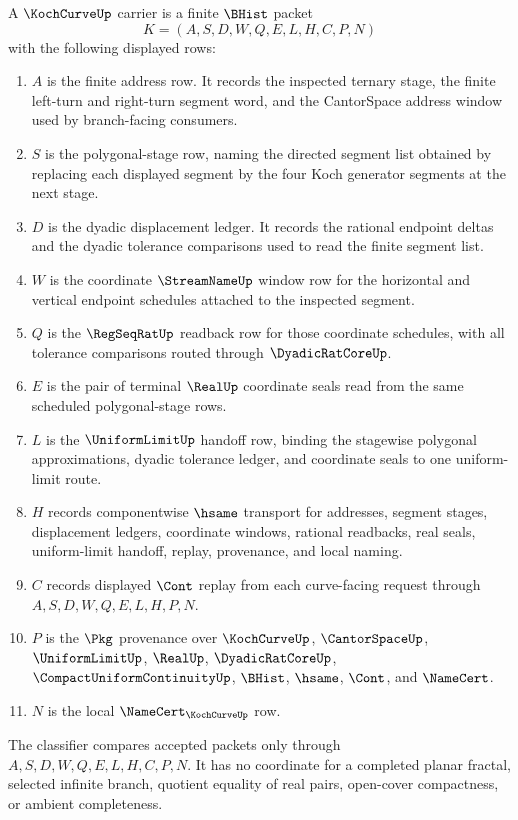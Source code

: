 \begin{definition}
\label{def:koch-curve-carrier}
A $\KochCurveUp$ carrier is a finite $\BHist$ packet
$$
K=(A,S,D,W,Q,E,L,H,C,P,N)
$$
with the following displayed rows:
\begin{enumerate}
\item $A$ is the finite address row. It records the inspected ternary stage, the finite left-turn and right-turn segment word, and the CantorSpace address window used by branch-facing consumers.
\item $S$ is the polygonal-stage row, naming the directed segment list obtained by replacing each displayed segment by the four Koch generator segments at the next stage.
\item $D$ is the dyadic displacement ledger. It records the rational endpoint deltas and the dyadic tolerance comparisons used to read the finite segment list.
\item $W$ is the coordinate $\StreamNameUp$ window row for the horizontal and vertical endpoint schedules attached to the inspected segment.
\item $Q$ is the $\RegSeqRatUp$ readback row for those coordinate schedules, with all tolerance comparisons routed through $\DyadicRatCoreUp$.
\item $E$ is the pair of terminal $\RealUp$ coordinate seals read from the same scheduled polygonal-stage rows.
\item $L$ is the $\UniformLimitUp$ handoff row, binding the stagewise polygonal approximations, dyadic tolerance ledger, and coordinate seals to one uniform-limit route.
\item $H$ records componentwise $\hsame$ transport for addresses, segment stages, displacement ledgers, coordinate windows, rational readbacks, real seals, uniform-limit handoff, replay, provenance, and local naming.
\item $C$ records displayed $\Cont$ replay from each curve-facing request through $A,S,D,W,Q,E,L,H,P,N$.
\item $P$ is the $\Pkg$ provenance over $\KochCurveUp$, $\CantorSpaceUp$, $\UniformLimitUp$, $\RealUp$, $\DyadicRatCoreUp$, $\CompactUniformContinuityUp$, $\BHist$, $\hsame$, $\Cont$, and $\NameCert$.
\item $N$ is the local $\NameCert_{\KochCurveUp}$ row.
\end{enumerate}
The classifier compares accepted packets only through $A,S,D,W,Q,E,L,H,C,P,N$. It has no coordinate for a completed planar fractal, selected infinite branch, quotient equality of real pairs, open-cover compactness, or ambient completeness.
\end{definition}

